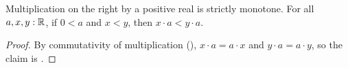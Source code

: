 \begin{corollary}
  \label{mulMonoRLtReal}
  Multiplication on the right by a positive real is strictly monotone. For all $a, x, y : \mathbb{R}$, if $0 < a$ and $x < y$, then $x \cdot a < y \cdot a$.
\end{corollary}
\begin{proof}
  By commutativity of multiplication (), $x \cdot a = a \cdot x$ and $y \cdot a = a \cdot y$, so the claim is .
\end{proof}
